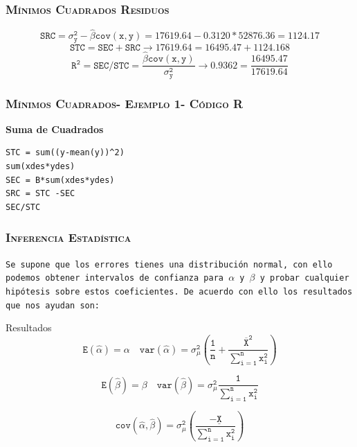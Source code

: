 \documentclass[16.5pt]{beamer}
\begin{document}
{
\begin{frame}
\frametitle{\textsc{Mínimos Cuadrados Residuos}}
\hspace*{-5mm}
\vspace*{-5mm} 
$$\mathtt{\boxed{ SRC  = \sigma_y^2 -\hat\beta cov(x,y)= 17619.64 - 0.3120*52876.36=1124.17}}$$
$$\mathtt{\boxed{ STC  =SEC + SRC \rightarrow 17619.64 = 16495.47+ 1124.168}}$$
$$\mathtt{\boxed{ R^2  =SEC/STC = \frac{\hat\beta cov(x,y)}{\sigma_y^2} \rightarrow 0.9362 = \frac{16495.47}{17619.64}}}$$

\end{frame}
}
{
\begin{frame}
\frametitle{\textsc{Mínimos Cuadrados- Ejemplo 1- Código R}}

\textbf{Suma de Cuadrados}
\begin{lstlisting}
STC = sum((y-mean(y))^2)
sum(xdes*ydes)
SEC = B*sum(xdes*ydes)
SRC = STC -SEC
SEC/STC

\end{lstlisting}

\end{frame}
}

{
\begin{frame}
\frametitle{\textsc{Inferencia Estadística}}
\hspace*{-5mm}
\vspace*{-5mm} 

\texttt{Se supone que los errores tienes una distribución normal, con ello podemos obtener intervalos de confianza para $\alpha$ y $\beta$ y probar cualquier hipótesis sobre estos coeficientes. De acuerdo con ello los resultados que nos ayudan son:}

\begin{block}{Resultados}
$$\mathtt{E(\hat\alpha)=\alpha \quad var(\hat\alpha)= \sigma_{\mu}^2(\frac{1}{n}+ \frac{\overline{X}^2}{\sum_{i=1}^nx_i^2})}$$

$$\mathtt{E(\hat\beta)=\beta \quad var(\hat\beta)= \sigma_{\mu}^2\frac{1}{\sum_{i=1}^nx_i^2}}$$

$$\mathtt{cov(\hat\alpha, \hat\beta) = \sigma_{\mu}^2(\frac{-\underline{X}}{\sum_{i=1}^n x_i^2})}$$


\end{block}

\end{frame}
}
\end{document}
